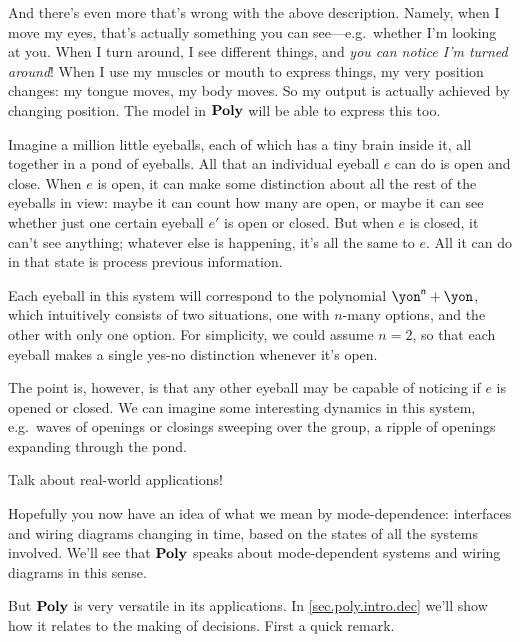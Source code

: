 \documentclass[Book-Poly]{subfiles}
\begin{document}
And there's even more that's wrong with the above description. Namely, when I move my eyes, that's actually something you can see---e.g.\ whether I'm looking at you. When I turn around, I see different things, and \emph{you can notice I'm turned around}! When I use my muscles or mouth to express things, my very position changes: my tongue moves, my body moves. So my output is actually achieved by changing position. The model in $\textbf{Poly}$ will be able to express this too.

\begin{example}\label{ex.pond_eyeballs}
Imagine a million little eyeballs, each of which has a tiny brain inside it, all together in a pond of eyeballs. All that an individual eyeball $e$ can do is open and close. When $e$ is open, it can make some distinction about all the rest of the eyeballs in view: maybe it can count how many are open, or maybe it can see whether just one certain eyeball $e'$ is open or closed. But when $e$ is closed, it can't see anything; whatever else is happening, it's all the same to $e$. All it can do in that state is process previous information.

Each eyeball in this system will correspond to the polynomial $\yon^\ord{n}+\yon$, which intuitively consists of two situations, one with $n$-many options, and the other with only one option. For simplicity, we could assume $n=2$, so that each eyeball makes a single yes-no distinction whenever it's open.

The point is, however, is that any other eyeball may be capable of noticing if $e$ is opened or closed. We can imagine some interesting dynamics in this system, e.g.\ waves of openings or closings sweeping over the group, a ripple of openings expanding through the pond.

Talk about real-world applications! 
\end{example}

Hopefully you now have an idea of what we mean by mode-dependence: interfaces and wiring diagrams changing in time, based on the states of all the systems involved. We'll see that $\textbf{Poly}$ speaks about mode-dependent systems and wiring diagrams in this sense. 

But $\textbf{Poly}$ is very versatile in its applications. In \cref{sec.poly.intro.dec} we'll show how it relates to the making of decisions. First a quick remark.
\end{document}
